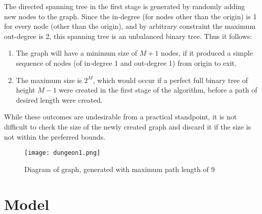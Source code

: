 \documentclass[landscape, a0, final]{a0poster}
\begin{document}
\begin{minipage}[c]{0.50\linewidth}
\begin{minipage}{0.50\linewidth}
\begin{minipage}{0.9\linewidth}
The directed spanning tree in the first stage is generated by randomly adding new nodes to the graph.  Since the in-degree (for nodes other than the origin) is 1 for every node (other than the origin), and by arbitrary constraint the maximum out-degree is 2, this spanning tree is an unbalanced binary tree.  Thus it follows: 
    \begin{enumerate} 
        \item The graph will have a minimum size of $M + 1$ nodes, if it produced a simple sequence of nodes (of in-degree 1 and out-degree 1) from origin to exit.  
        \item The maximum size is $2^{M}$, which would occur if a perfect full binary tree of height $M - 1$ were created in the first stage of the algorithm, before a path of desired length were created.  
    \end{enumerate} 
While these outcomes are undesirable from a practical standpoint, it is not difficult to check the size of the newly created graph and discard it if the size is not within the preferred bounds.

\centering 
        \begin{figure}[H]
            \texttt{[image: dungeon1.png]} 
            \caption{Diagram of graph, generated with maximum path length of 9} 
            \label{graph8}
        \end{figure}

\end{minipage} %
\end{minipage} %
\begin{minipage}[c]{0.50\linewidth} %
\centering 
\begin{minipage}{0.9\linewidth} %
\section{Model}


\end{minipage}
\end{minipage}
\end{minipage}
\end{document}
